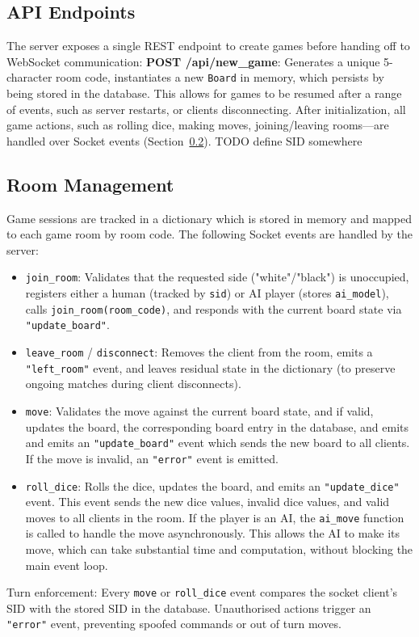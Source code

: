 \subsection{API Endpoints}
The server exposes a single REST endpoint to create games before handing off to WebSocket communication:
\textbf{POST /api/new\_game}: Generates a unique 5-character room code, instantiates a new \texttt{Board} in memory, which persists by being stored in the database. This allows for games to be resumed after a range of events, such as server restarts, or clients disconnecting. 
After initialization, all game actions, such as rolling dice, making moves, joining/leaving rooms—are handled over Socket events (Section~\ref{sec:room-management}).
TODO define SID somewhere


\subsection{Room Management}
\label{sec:room-management}
Game sessions are tracked in a dictionary which is stored in memory and mapped to each game room by room code. The following Socket events are handled by the server:
\begin{itemize}
\item \texttt{join\_room}: Validates that the requested side ("white"/"black") is unoccupied, registers either a human (tracked by \texttt{sid}) or AI player (stores \texttt{ai\_model}), calls \texttt{join\_room(room\_code)}, and responds with the current board state via \texttt{"update\_board"}.
\item \texttt{leave\_room} / \texttt{disconnect}: Removes the client from the room, emits a \texttt{"left\_room"} event, and leaves residual state in the dictionary (to preserve ongoing matches during client disconnects).
\item \texttt{move}: Validates the move against the current board state, and if valid, updates the board, the corresponding board entry in the database, and emits and emits an \texttt{"update\_board"} event which sends the new board to all clients. If the move is invalid, an \texttt{"error"} event is emitted.
\item \texttt{roll\_dice}: Rolls the dice, updates the board, and emits an \texttt{"update\_dice"} event. This event sends the new dice values, invalid dice values, and valid moves to all clients in the room. 
If the player is an AI, the \texttt{ai\_move} function is called to handle the move asynchronously. This allows the AI to make its move, which can take substantial time and computation, without blocking the main event loop.
\end{itemize}
Turn enforcement: Every \texttt{move} or \texttt{roll\_dice} event compares the socket client's SID with the stored SID in the database. Unauthorised actions trigger an \texttt{"error"} event, preventing spoofed commands or out of turn moves.

